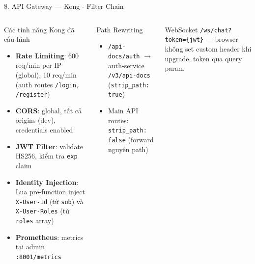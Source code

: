 \documentclass[aspectratio=169,compress]{beamer}
\begin{document}
\begin{frame}{8. API Gateway --- Kong - Filter Chain}
\begin{columns}[T]
\begin{block}{Các tính năng Kong đã cấu hình}
\begin{itemize}
  \item \textbf{Rate Limiting}: 600 req/min per IP (global), 10 req/min (auth routes \texttt{/login, /register})
  \item \textbf{CORS}: global, tất cả origins (dev), credentials enabled
  \item \textbf{JWT Filter}: validate HS256, kiểm tra \texttt{exp} claim
  \item \textbf{Identity Injection}: Lua pre-function inject \texttt{X-User-Id} (từ \texttt{sub}) và \texttt{X-User-Roles} (từ \texttt{roles} array)
  \item \textbf{Prometheus}: metrics tại admin \texttt{:8001/metrics}
\end{itemize}
\end{block}
\begin{block}{Path Rewriting}
\begin{itemize}
  \item \texttt{/api-docs/auth} $\rightarrow$ auth-service \texttt{/v3/api-docs} (\texttt{strip\_path: true})
  \item Main API routes: \texttt{strip\_path: false} (forward nguyên path)
\end{itemize}
\end{block}
\begin{block}{WebSocket}
\texttt{/ws/chat?token=\{jwt\}} --- browser không set custom header khi upgrade, token qua query param
\end{block}
\end{columns}
\end{frame}
\end{document}
